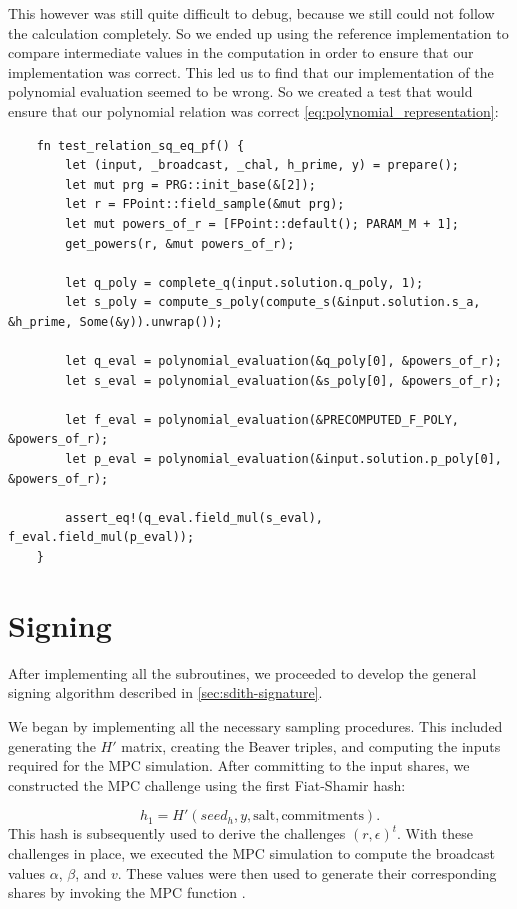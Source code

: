 \documentclass[11pt]{report}
\theoremstyle{definition}
\theoremstyle{plain}
\begin{document}
This however was still quite difficult to debug, because we still could not follow the calculation completely.
So we ended up using the reference implementation to compare intermediate values in the computation in order to ensure that our implementation was correct.
This led us to find that our implementation of the polynomial evaluation seemed to be wrong. So we created a test that would ensure that our polynomial relation was correct \autoref{eq:polynomial_representation}:
\begin{verbatim}
    fn test_relation_sq_eq_pf() {
        let (input, _broadcast, _chal, h_prime, y) = prepare();
        let mut prg = PRG::init_base(&[2]);
        let r = FPoint::field_sample(&mut prg);
        let mut powers_of_r = [FPoint::default(); PARAM_M + 1];
        get_powers(r, &mut powers_of_r);

        let q_poly = complete_q(input.solution.q_poly, 1);
        let s_poly = compute_s_poly(compute_s(&input.solution.s_a, &h_prime, Some(&y)).unwrap());

        let q_eval = polynomial_evaluation(&q_poly[0], &powers_of_r);
        let s_eval = polynomial_evaluation(&s_poly[0], &powers_of_r);

        let f_eval = polynomial_evaluation(&PRECOMPUTED_F_POLY, &powers_of_r);
        let p_eval = polynomial_evaluation(&input.solution.p_poly[0], &powers_of_r);

        assert_eq!(q_eval.field_mul(s_eval), f_eval.field_mul(p_eval));
    }
\end{verbatim}

\section{Signing}\label{sub:signing}
After implementing all the subroutines, we proceeded to develop the general signing algorithm described in \autoref{sec:sdith-signature}.

We began by implementing all the necessary sampling procedures. This included generating the $H'$ matrix, creating the Beaver triples, and computing the inputs required for the MPC simulation. After committing to the input shares, we constructed the MPC challenge using the first Fiat-Shamir hash:

\[
  h_1 = H'(seed_h, y, \text{salt}, \text{commitments}).
\]
This hash is subsequently used to derive the challenges $(r, \epsilon)^t$. With these challenges in place, we executed the MPC simulation to compute the broadcast values $\alpha$, $\beta$, and $v$. These values were then used to generate their corresponding shares by invoking the MPC function .
\end{document}
